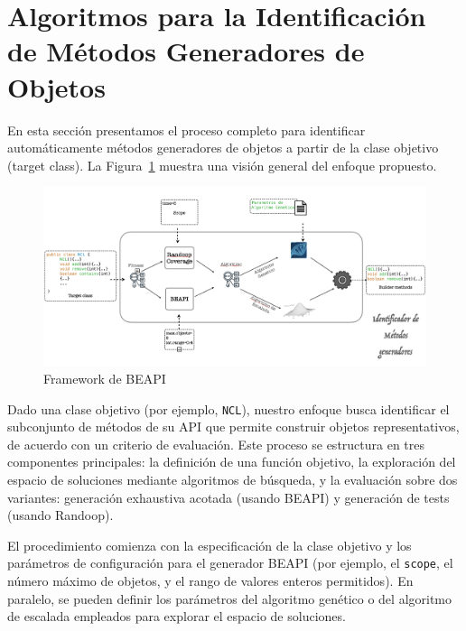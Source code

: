 
\section{Algoritmos para la Identificación de Métodos Generadores de Objetos}
\label{sec:algorithms}

En esta sección presentamos el proceso completo para identificar automáticamente métodos generadores de objetos a partir de la clase objetivo (target class). 
La Figura~\ref{fig:builders-overview} muestra una visión general del enfoque propuesto.


\begin{figure}[H]
  \centering
  \includegraphics[width=1.0\textwidth]{images/builders.png}
  \caption{Framework de BEAPI}
  \label{fig:builders-overview}
\end{figure}


Dado una clase objetivo (por ejemplo, \texttt{NCL}), nuestro enfoque busca identificar el subconjunto de métodos de su API que permite construir objetos representativos, de acuerdo con un criterio de evaluación. 
Este proceso se estructura en tres componentes principales: la definición de una función objetivo, la exploración del espacio de soluciones mediante algoritmos de búsqueda, 
y la evaluación sobre dos variantes: generación exhaustiva acotada (usando BEAPI) y generación de tests (usando Randoop).

El procedimiento comienza con la especificación de la clase objetivo y los parámetros de configuración para el generador BEAPI (por ejemplo, el \texttt{scope}, el número máximo de objetos, y el rango de valores enteros permitidos). 
En paralelo, se pueden definir los parámetros del algoritmo genético o del algoritmo de escalada empleados para explorar el espacio de soluciones.

